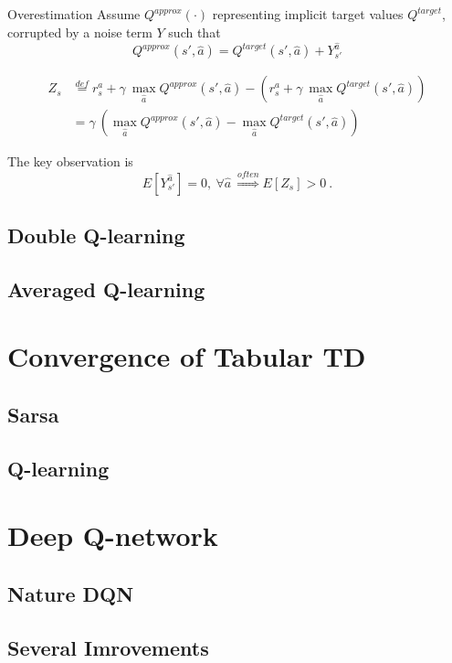 \documentclass{beamer}
\newcommand{\qa}{Q^{approx}}
\newcommand{\qt}{Q^{target}}
\newcommand{\ha}{\hat{a}}
\begin{document}
\begin{frame}{Overestimation}
	Assume $Q^{approx}(\cdot)$ representing implicit target values $Q^{target}$, corrupted by a noise term $Y$ such that
	\begin{equation}\nonumber
		\qa(s',\ha) = \qt(s', \ha) + Y_{s'}^{\ha}
	\end{equation}
	
	\begin{equation}
	\begin{aligned}
		Z_s &\overset{def}{=} r_s^a + \gamma~ \max_{\ha} \qa(s', \ha) - \left( r_s^a + \gamma~  \max_{\ha} \qt(s', \ha)\right) \\
		& = \gamma~ \left( \max_{\ha} \qa(s', \ha) - \max_{\ha} \qt(s', \ha)\right)
	\end{aligned}
	\end{equation}
	
	The key observation is
	\begin{equation}
		E[Y_{s'}^{\ha}] = 0, ~ \forall \ha ~ \overset{often}{\Longrightarrow} E[Z_s] > 0 ~.
	\end{equation}
\end{frame}


\subsection{Double Q-learning}
\subsection{Averaged Q-learning}



\section{Convergence of Tabular TD}
\subsection{Sarsa}
\subsection{Q-learning}




\section{Deep Q-network}

\subsection{Nature DQN}
\subsection{Several Imrovements}
\end{document}
